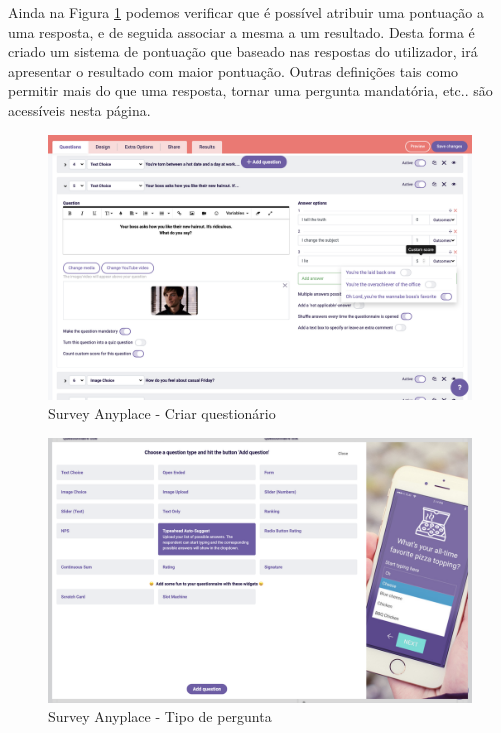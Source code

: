 Ainda na Figura \ref{fig:sap-create} podemos verificar que é possível atribuir uma pontuação a uma resposta, e de seguida associar a mesma a um resultado. Desta forma é criado um sistema de pontuação que baseado nas respostas do utilizador, irá apresentar o resultado com maior pontuação. Outras definições tais como permitir mais do que uma resposta, tornar uma pergunta mandatória, etc.. são acessíveis nesta página.

\newpage

\begin{figure}[ht!]
	\begin{center}
		\includegraphics[width=1\textwidth]{img/sap/create}
		\caption{Survey Anyplace - Criar questionário}
		\label{fig:sap-create}
	\end{center}
\end{figure}

\begin{figure}[ht!]
	\begin{center}
		\includegraphics[width=1\textwidth]{img/sap/type}
		\caption{Survey Anyplace - Tipo de pergunta}
		\label{fig:sap-type}
	\end{center}
\end{figure}
\pagebreak

